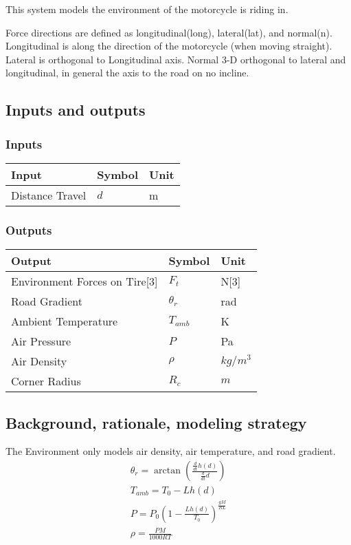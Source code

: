 \documentclass[../SimBALink.tex]{subfiles}
\begin{document}
This system models the environment of the motorcycle is riding in.

Force directions are defined as longitudinal(long), lateral(lat), and normal(n). Longitudinal is along the direction of the motorcycle (when moving straight). Lateral is orthogonal to Longitudinal axis. Normal 3-D orthogonal to lateral and longitudinal, in general the axis to the road on no incline.

\subsection{Inputs and outputs}
	\subsubsection{Inputs}
	\begin{tabular}{ l | l | l  }
		Input					&	Symbol		&	Unit		\\	\hline
		Distance Travel			&	$d$			&	m
	\end{tabular}
	
	\subsubsection{Outputs}
	\begin{tabular}{ l | l | l  }
		Output								&	Symbol		&	Unit		\\	\hline
		Environment Forces on Tire[3]		&	$F_t$		&	N[3] \\
		Road Gradient						&	$\theta_r$	&	rad \\
		Ambient Temperature					&	$T_{amb}$	&  K \\
		Air Pressure						&	$P$  		& Pa \\
		Air Density 						&	$\rho$		& $kg/m^3$ \\
		Corner Radius 						&	$R_c$		& $m$
	\end{tabular}

\subsection{Background, rationale, modeling strategy}
The Environment only models air density, air temperature, and road gradient.
	\begin{gather}
		\theta_r  = \arctan\left(\frac{\frac{d}{dt} h(d)}{\frac{d}{dt} d}\right) \\
		T_{amb} = T_0 - L h(d) \\
		P = P_0 \left( 1 - \frac{L h(d)}{T_0} \right)^{\frac{gM}{RL}}\\
		\rho = \frac{PM}{1000RT}  
\end{gather}
\end{document}
